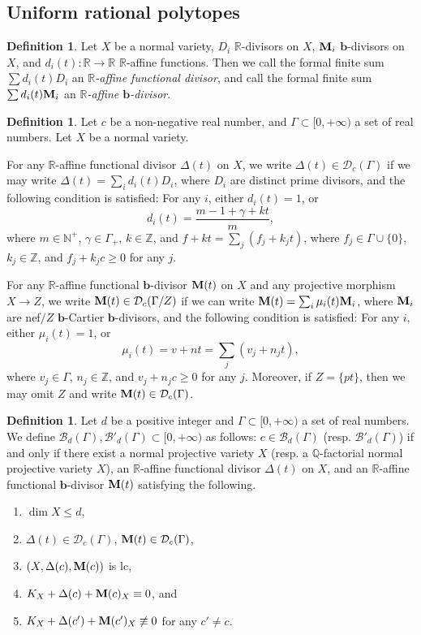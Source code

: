 \documentclass[11pt]{amsart}
\numberwithin{equation}{section}
\newcommand{\bb}{\bm{b}}
\newcommand{\Mm}{{\bf{M}}}
\newcommand{\Qq}{\mathbb{Q}}
\newcommand{\Rr}{\mathbb{R}}
\newcommand{\Ii}{\Gamma}
\theoremstyle{definition}
\newtheorem{defn}[thm]{Definition}
\theoremstyle{definition}
\theoremstyle{definition}
\begin{document}
\subsection{Uniform rational polytopes}\label{subsec: urp}

\begin{defn}\label{defn: r affine functional divisor}
Let $X$ be a normal variety, $D_i$ $\Rr$-divisors on $X$, $\Mm_i$ $\bb$-divisors  on $X$, and $d_i(t):\mathbb R\rightarrow\mathbb R$ $\Rr$-affine functions. Then we call the formal finite sum $\sum d_i(t)D_i$ an \emph{$\Rr$-affine functional divisor}, and call the formal finite sum $\sum d_i(t)\Mm_i$ an \emph{$\Rr$-affine $\bb$-divisor}.
\end{defn}

\begin{defn}
Let $c$ be a non-negative real number, and $\Ii\subset[0,+\infty)$ a set of real numbers. Let $X$ be a normal variety.

For any $\Rr$-affine functional divisor $\Delta(t)$ on $X$, we write $\Delta(t)\in\mathcal{D}_c(\Ii)$ if we may write $\Delta(t)=\sum_id_i(t)D_i$, where $D_i$ are distinct prime divisors, and the following condition is satisfied: For any $i$, either $d_i(t)=1$, or 
$$d_i(t)=\frac{m-1+\gamma+kt}{m},$$
where $m\in\mathbb{N}^{+}$, $\gamma\in\Ii_+$, $k\in\mathbb{Z}$, and $f+kt=\sum_{j}(f_j+k_jt)$, where $f_j\in\Ii\cup\{0\}$, $k_j\in\mathbb{Z}$, and $f_j+k_jc\ge0$  for any $j$.


For any $\Rr$-affine functional $\bb$-divisor $\Mm(t)$ on $X$ and any projective morphism $X\rightarrow Z$, we write $\Mm(t)\in\mathcal{D}_c(\Ii/Z)$ if we can write $\Mm(t)=\sum_i\mu_i(t)\Mm_i$, where $\Mm_i$ are nef$/Z$ $\bb$-Cartier $\bb$-divisors, and the following condition is satisfied: For any $i$, either $\mu_i(t)=1$, or
$$\mu_i(t)=v+nt=\sum_j(v_j+n_jt),$$
where $v_j\in\Ii$, $n_j\in\mathbb Z$, and $v_j+n_jc\geq 0$ for any $j$. Moreover, if $Z=\{pt\}$, then we may omit $Z$ and write $\Mm(t)\in\mathcal{D}_c(\Ii)$.
\end{defn}

\begin{defn}
Let $d$ be a positive integer and  $\Ii\subset[0,+\infty)$ a set of real numbers. We define $\mathcal{B}_{d}(\Ii),\mathcal{B}'_{d}(\Ii)\subset [0,+\infty)$ as follows: $c\in\mathcal{B}_{d}(\Ii)$ (resp. $\mathcal{B}'_{d}(\Ii)$) if and only if there exist a normal projective variety $X$ (resp. a $\Qq$-factorial normal projective variety $X$), an $\Rr$-affine functional divisor $\Delta(t)$ on $X$, and an $\Rr$-affine functional $\bb$-divisor $\Mm(t)$ satisfying the following.
\begin{enumerate}
	\item $\dim X\le d$, 
	\item $\Delta(t)\in\mathcal{D}_{c}(\Ii)$, $\Mm(t)\in\mathcal{D}_c(\Ii)$,
	\item $(X,\Delta(c),\Mm(c))$ is lc,
	\item $K_X+\Delta(c)+\Mm(c)_X\equiv0$, and
	\item $K_X+\Delta(c')+\Mm(c')_X\not\equiv 0$ for any $c'\neq c$.
\end{enumerate}
\end{defn}
\end{document}
